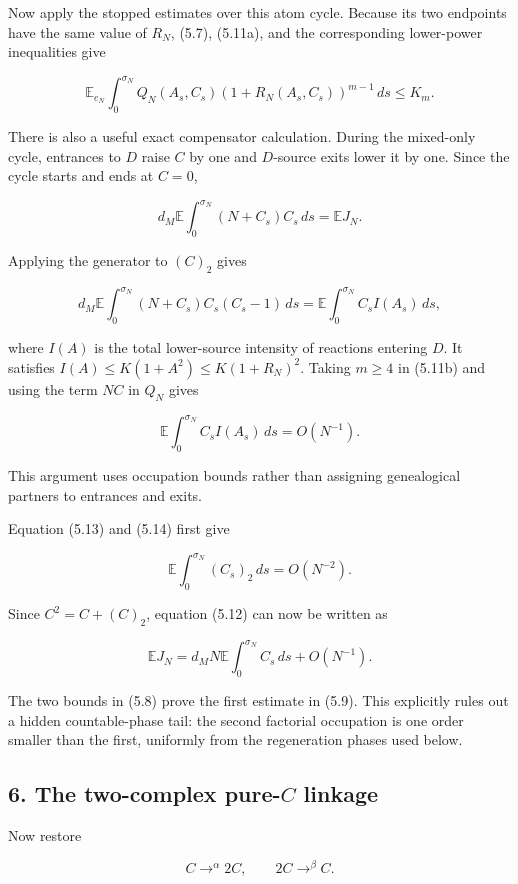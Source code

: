 Now apply the stopped estimates over this atom cycle. Because its two
endpoints have the same value of \(R_N\), (5.7), (5.11a), and the
corresponding lower-power inequalities give

\[
 \mathbb E_{e_N}\int_0^{\sigma_N}
 Q_N(A_s,C_s)(1+R_N(A_s,C_s))^{m-1}\,ds\le K_m.
\tag{5.11b}
\]

There is also a useful exact compensator calculation. During the
mixed-only cycle, entrances to \(D\) raise \(C\) by one and \(D\)-source
exits lower it by one. Since the cycle starts and ends at \(C=0\),

\[
 d_M\mathbb E\int_0^{\sigma_N}(N+C_s)C_s\,ds
 =\mathbb EJ_N.
\tag{5.12}
\]

Applying the generator to \((C)_2\) gives

\[
 d_M\mathbb E\int_0^{\sigma_N}
 (N+C_s)C_s(C_s-1)\,ds
 =\mathbb E\int_0^{\sigma_N}C_s I(A_s)\,ds,
\tag{5.13}
\]

where \(I(A)\) is the total lower-source intensity of reactions entering
\(D\). It satisfies \(I(A)\le K(1+A^2)\le K(1+R_N)^2\). Taking \(m\ge4\)
in (5.11b) and using the term \(NC\) in \(Q_N\) gives

\[
 \mathbb E\int_0^{\sigma_N}C_sI(A_s)\,ds=O(N^{-1}).
\tag{5.14}
\]

This argument uses occupation bounds rather than assigning genealogical
partners to entrances and exits.

Equation (5.13) and (5.14) first give

\[
 \mathbb E\int_0^{\sigma_N}(C_s)_2\,ds=O(N^{-2}).
\tag{5.15}
\]

Since \(C^2=C+(C)_2\), equation (5.12) can now be written as

\[
 \mathbb EJ_N
 =d_MN\mathbb E\int_0^{\sigma_N}C_s\,ds+O(N^{-1}).
\tag{5.16}
\]

The two bounds in (5.8) prove the first estimate in (5.9). This
explicitly rules out a hidden countable-phase tail: the second factorial
occupation is one order smaller than the first, uniformly from the
regeneration phases used below.

\subsection{\texorpdfstring{6. The two-complex pure-\(C\)
linkage}{6. The two-complex pure-C linkage}}

Now restore

\[
 C\mathop{\longrightarrow}^{\alpha}2C,
 \qquad
 2C\mathop{\longrightarrow}^{\beta}C.
\tag{6.1}
\]

